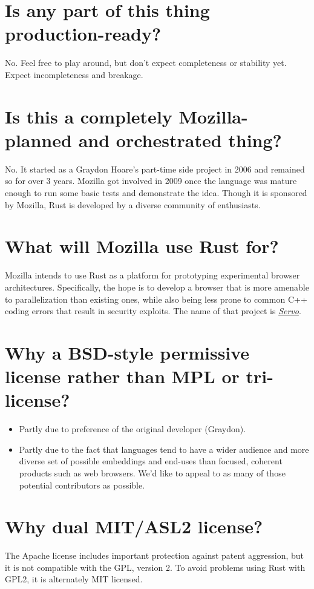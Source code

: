 \documentclass[]{article}
\begin{document}
\section{Is any part of this thing
production-ready?}\label{is-any-part-of-this-thing-production-ready}

No. Feel free to play around, but don't expect completeness or stability
yet. Expect incompleteness and breakage.

\section{Is this a completely Mozilla-planned and orchestrated
thing?}\label{is-this-a-completely-mozilla-planned-and-orchestrated-thing}

No. It started as a Graydon Hoare's part-time side project in 2006 and
remained so for over 3 years. Mozilla got involved in 2009 once the
language was mature enough to run some basic tests and demonstrate the
idea. Though it is sponsored by Mozilla, Rust is developed by a diverse
community of enthusiasts.

\section{What will Mozilla use Rust
for?}\label{what-will-mozilla-use-rust-for}

Mozilla intends to use Rust as a platform for prototyping experimental
browser architectures. Specifically, the hope is to develop a browser
that is more amenable to parallelization than existing ones, while also
being less prone to common C++ coding errors that result in security
exploits. The name of that project is
\emph{\href{http://github.com/mozilla/servo}{Servo}}.

\section{Why a BSD-style permissive license rather than MPL or
tri-license?}\label{why-a-bsd-style-permissive-license-rather-than-mpl-or-tri-license}

\begin{itemize}
\itemsep1pt\parskip0pt
\item
  Partly due to preference of the original developer (Graydon).
\item
  Partly due to the fact that languages tend to have a wider audience
  and more diverse set of possible embeddings and end-uses than focused,
  coherent products such as web browsers. We'd like to appeal to as many
  of those potential contributors as possible.
\end{itemize}

\section{Why dual MIT/ASL2 license?}\label{why-dual-mitasl2-license}

The Apache license includes important protection against patent
aggression, but it is not compatible with the GPL, version 2. To avoid
problems using Rust with GPL2, it is alternately MIT licensed.
\end{document}
